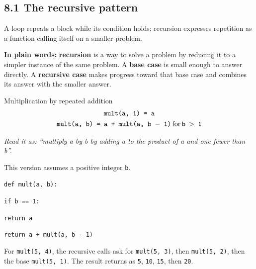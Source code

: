 \documentclass[11pt]{article}
\begin{document}
\begin{keepsection}
\section{8.1 The recursive pattern}

A loop repeats a block while its condition holds; recursion expresses repetition as a function calling itself on a smaller problem.

\begin{plainbox}\textbf{In plain words:} \textbf{recursion} is a way to solve a problem by reducing it to a simpler instance of the same problem. A \textbf{base case} is small enough to answer directly. A \textbf{recursive case} makes progress toward that base case and combines its answer with the smaller answer.\end{plainbox}

\begin{equationcard}{Multiplication by repeated addition}
\[ \begin{gathered} \texttt{mult(a, 1) = a} \\ \texttt{mult(a, b) = a + mult(a, b \ensuremath{-} 1)}\, \text{for}\, \texttt{b \ensuremath{>} 1} \end{gathered} \]
{\small \emph{Read it as: “multiply a by b by adding a to the product of a and one fewer than b”.}\par  This version assumes a positive integer \texttt{b}.}
\end{equationcard}
\begin{tcolorbox}[colback=Paperblue,colframe=Paperblue,boxrule=0pt,arc=0pt,left=7pt,right=7pt,top=5pt,bottom=5pt]\small\sloppy
\noindent\hspace*{0em}\texttt{def mult(a, b):}\par
\noindent\hspace*{1em}\texttt{if b == 1:}\par
\noindent\hspace*{3em}\texttt{return a}\par
\noindent\hspace*{1em}\texttt{return a + mult(a, b - 1)}\par
\end{tcolorbox}

For \texttt{mult(5, 4)}, the recursive calls ask for \texttt{mult(5, 3)}, then \texttt{mult(5, 2)}, then the base \texttt{mult(5, 1)}. The result returns as \texttt{5}, \texttt{10}, \texttt{15}, then \texttt{20}.


\end{keepsection}
\end{document}
